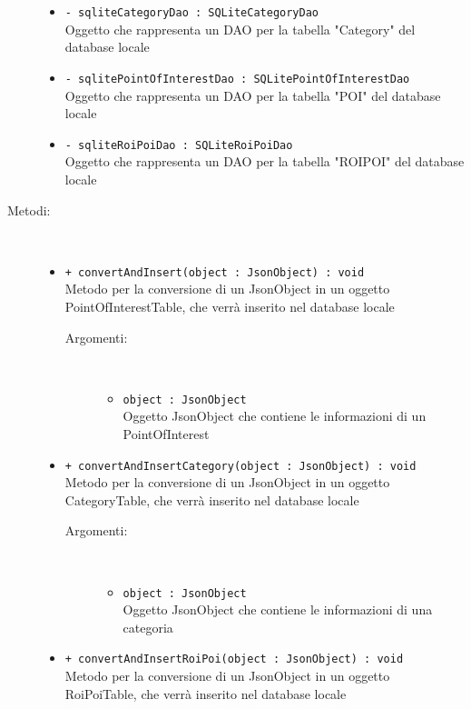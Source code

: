 \documentclass[../DefinizioneDiProdotto.tex]{subfiles}
\begin{document}
\begin{description}
\begin{itemize}
\item \texttt{- sqliteCategoryDao : SQLiteCategoryDao}\\
Oggetto che rappresenta un DAO per la tabella "Category" del database locale

\item \texttt{- sqlitePointOfInterestDao : SQLitePointOfInterestDao}\\
Oggetto che rappresenta un DAO per la tabella "POI" del database locale

\item \texttt{- sqliteRoiPoiDao : SQLiteRoiPoiDao}\\
Oggetto che rappresenta un DAO per la tabella "ROIPOI" del database locale

\end{itemize}
\item[Metodi:] \
\begin{itemize}
\item \texttt{+ convertAndInsert(object : JsonObject) : void}\\
Metodo per la conversione di un JsonObject in un oggetto PointOfInterestTable, che verrà inserito nel database locale
 \begin{description}
\item[Argomenti:] \
\begin{itemize}
\item \texttt{object : JsonObject}\\
Oggetto JsonObject che contiene le informazioni di un PointOfInterest\end{itemize}
\end{description}
\item \texttt{+ convertAndInsertCategory(object : JsonObject) : void}\\
Metodo per la conversione di un JsonObject in un oggetto CategoryTable, che verrà inserito nel database locale
 \begin{description}
\item[Argomenti:] \
\begin{itemize}
\item \texttt{object : JsonObject}\\
Oggetto JsonObject che contiene le informazioni di una categoria\end{itemize}
\end{description}
\item \texttt{+ convertAndInsertRoiPoi(object : JsonObject) : void}\\
Metodo per la conversione di un JsonObject in un oggetto RoiPoiTable, che verrà inserito nel database locale

\end{itemize}
\end{description}
\end{document}
